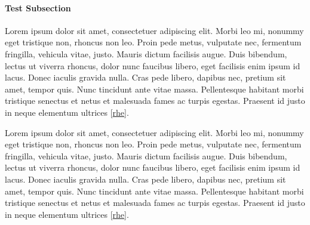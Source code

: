 \documentclass[a4paper,10pt,openany,oneside,english]{sphinxmanual}
\begin{document}
\paragraph{Test Subsection}
\label{\detokenize{guides/operational/cso/citations:test-subsection}}
\sphinxAtStartPar
Lorem ipsum dolor sit amet, consectetuer adipiscing elit. Morbi leo mi, nonummy eget tristique non, rhoncus non leo.
Proin pede metus, vulputate nec, fermentum fringilla, vehicula vitae, justo. Mauris dictum facilisis augue. Duis bibendum,
lectus ut viverra rhoncus, dolor nunc faucibus libero, eget facilisis enim ipsum id lacus. Donec iaculis gravida nulla.
Cras pede libero, dapibus nec, pretium sit amet, tempor quis. Nunc tincidunt ante vitae massa. Pellentesque habitant
morbi tristique senectus et netus et malesuada fames ac turpis egestas.
Praesent id justo in neque elementum ultrices {[}\hyperlink{cite.guides/operational/cso/citations:id5}{rhe}{]}.

\sphinxAtStartPar
Lorem ipsum dolor sit amet, consectetuer adipiscing elit. Morbi leo mi, nonummy eget tristique non, rhoncus non leo.
Proin pede metus, vulputate nec, fermentum fringilla, vehicula vitae, justo. Mauris dictum facilisis augue. Duis bibendum,
lectus ut viverra rhoncus, dolor nunc faucibus libero, eget facilisis enim ipsum id lacus. Donec iaculis gravida nulla.
Cras pede libero, dapibus nec, pretium sit amet, tempor quis. Nunc tincidunt ante vitae massa. Pellentesque habitant
morbi tristique senectus et netus et malesuada fames ac turpis egestas.
Praesent id justo in neque elementum ultrices {[}\hyperlink{cite.guides/operational/cso/citations:id5}{rhe}{]}.

\sphinxAtStartPar
\end{document}
